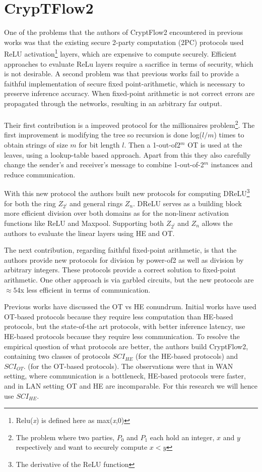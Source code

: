 \documentclass[../thesis.tex]{subfiles}
\begin{document}
\section{CrypTFlow2}
One of the problems that the authors of CryptFlow2 encountered in previous works was that the existing secure 2-party computation (2PC) protocols used ReLU activation\footnote{Relu(\textit{x}) is defined here as max(\textit{x},0)} layers, which are expensive to compute securely. Efficient approaches to evaluate ReLu layers require a sacrifice in terms of security, which is not desirable. A second problem was that previous works fail to provide a faithful implementation of secure fixed point-arithmetic, which is necessary to preserve inference accuracy. When fixed-point arithmetic is not correct errors are propagated through the networks, resulting in an arbitrary far output. \paragraph{}

Their first contribution is a improved protocol for the millionaires problem\footnote{The problem where two parties, $P_0$ and $P_1$ each hold an integer, $x$ and $y$ respectively and want to securely compute $x<y$}. The first improvement is modifying the tree so recursion is done log($l/m$) times to obtain strings of size $m$ for bit length $l$. Then a 1-out-of2$^m$ OT is used at the leaves, using a lookup-table based approach. Apart from this they also carefully change the sender's and receiver's message to combine 1-out-of-2$^m$ instances and reduce communication.  

With this new protocol the authors built new protocols for computing DReLU\footnote{The derivative of the ReLU function} for both the ring $Z_{2^l}$ and general rings $Z_n$. DReLU serves as a building block more efficient division over both domains as for the non-linear activation functions like ReLU and Maxpool. Supporting both $Z_{2^l}$ and $Z_n$ allows the authors to evaluate the linear layers using HE and OT. 

The next contribution, regarding faithful fixed-point arithmetic, is that the authors provide new protocols for division by power-of2 as well as division by arbitrary integers. These protocols provide a correct solution to fixed-point arithmetic. One other approach is via garbled circuits, but the new protocols are $\approx 54$x less efficient in terms of communication. 

Previous works have discussed the OT vs HE conundrum. Initial works have used OT-based protocols because they require less computation than HE-based protocols, but the state-of-the art protocols, with better inference latency, use HE-based protocols because they require less communication. To resolve the empirical question of what protocols are better, the authors build CryptFlow2, containing two classes of protocols $SCI_{HE}$ (for the HE-based protocols) and $SCI_{OT}$. (for the OT-based protocols). The observations were that in WAN setting, where communication is a bottleneck, HE-based protocols were faster, and in LAN setting OT and HE are incomparable. For this research we will hence use $SCI_{HE}$.
\end{document}
